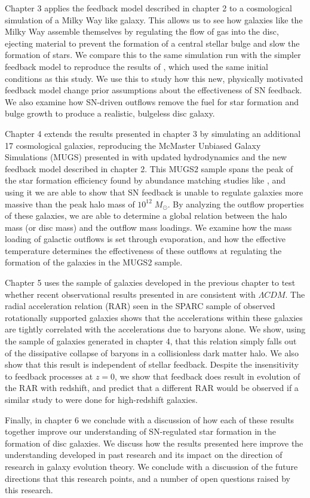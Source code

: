 Chapter 3 applies the feedback model described in chapter 2 to a cosmological
simulation of a Milky Way like galaxy.  This allows us to see how galaxies like
the Milky Way assemble themselves by regulating the flow of gas into the disc,
ejecting material to prevent the formation of a central stellar bulge and slow
the formation of stars.  We compare this to the same simulation run with the
simpler \citet{Stinson2006} feedback model to reproduce the results of
\citet{Stinson2010}, which used the same initial conditions as this study.  We
use this to study how this new, physically motivated feedback model change prior
assumptions about the effectiveness of SN feedback.  We also examine how
SN-driven outflows remove the fuel for star formation and bulge growth to
produce a realistic, bulgeless disc galaxy.

Chapter 4 extends the results presented in chapter 3 by simulating an additional
17 cosmological galaxies, reproducing the McMaster Unbiased Galaxy Simulations
(MUGS) presented in \citet{Stinson2010} with updated hydrodynamics and the new
feedback model described in chapter 2.  This MUGS2 sample spans the peak of the
star formation efficiency found by abundance matching studies like
\citet{Moster2013}, and using it we are able to show that SN feedback is unable
to regulate galaxies more massive than the peak halo mass of $10^{12}\;M_\odot$.
By analyzing the outflow properties of these galaxies, we are able to determine
a global relation between the halo mass (or disc mass) and the outflow mass
loadings.  We examine how the mass loading of galactic outflows is set through
evaporation, and how the effective temperature determines the effectiveness of
these outflows at regulating the formation of the galaxies in the MUGS2 sample.

Chapter 5 uses the sample of galaxies developed in the previous chapter to
test whether recent observational results presented in \citet{McGaugh2016}
are consistent with $\Lambda CDM$.  The radial acceleration relation (RAR) seen in
the SPARC sample \citep{Lelli2016b} of observed rotationally supported galaxies
shows that the accelerations within these galaxies are tightly correlated 
with the accelerations due to baryons alone.  We show, using the sample of
galaxies generated in chapter 4, that this relation simply falls out of the
dissipative collapse of baryons in a collisionless dark matter halo.  We also
show that this result is independent of stellar feedback.  Despite the insensitivity
to feedback processes at $z=0$, we show that feedback does result in evolution
of the RAR with redshift, and predict that a different RAR would be observed if
a similar study to \citet{Lelli2016b} were done for high-redshift galaxies.

Finally, in chapter 6 we conclude with a discussion of how each of these results
together improve our understanding of SN-regulated star formation in the
formation of disc galaxies.  We discuss how the results presented here improve
the understanding developed in past research and its impact on the direction of
research in galaxy evolution theory.  We conclude with a discussion of the
future directions that this research points, and a number of open questions
raised by this research.



